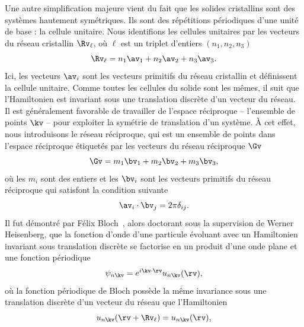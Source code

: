 Une autre simplification majeure vient du fait que les solides cristallins sont des systèmes hautement symétriques. Ils sont des répétitions périodiques d'une unité de base : la cellule unitaire. Nous identifions les cellules unitaires par les vecteurs du réseau cristallin $\Rv_\ell$, où $\ell$ est un triplet d'entiers $(n_1,n_2,n_3)$
\begin{equation}
    \Rv_\ell = n_1\av_1+n_2\av_2+n_3\av_3.
    \label{eqn:c2_Rl}
\end{equation}
Ici, les vecteurs $\av_i$ sont les vecteurs primitifs du réseau cristallin et définissent la cellule unitaire. Comme toutes les cellules du solide sont les mêmes, il suit que l'Hamiltonien est invariant sous une translation discrète d'un vecteur du réseau. Il est généralement favorable de travailler de l'espace réciproque -- l'ensemble de points $\kv$ -- pour exploiter la symétrie de translation d'un système. À cet effet, nous introduisons le réseau réciproque, qui est un ensemble de points dans l'espace réciproque étiquetés par les vecteurs du réseau réciproque $\Gv$
\begin{equation}
    \Gv = m_1\bv_1+m_2\bv_2+m_3\bv_3,
    \label{eqn:c2_G}
\end{equation}
où les $m_i$ sont des entiers et les $\bv_i$ sont les vecteurs primitifs du réseau réciproque qui satisfont la condition suivante
\begin{equation}
    \av_i\cdot\bv_j=2\pi\delta_{ij}.
\end{equation}
Il fut démontré par Félix Bloch~\cite{blochUeberQuantenmechanikElektronen1929}, alors doctorant sous la supervision de Werner Heisenberg, que la fonction d'onde d'une particule évoluant avec un Hamiltonien invariant sous translation discrète se factorise en un produit d'une onde plane et une fonction périodique
\begin{equation}
    \psi_{n\kv}=e^{i\kv\cdot\rv}u_{n\kv}(\rv),
    \label{eqn:c2_bloch_thm}
\end{equation}
où la fonction périodique de Bloch possède la même invariance sous une translation discrète d'un vecteur du réseau que l'Hamiltonien
\begin{equation}
    u_{n\kv}(\rv+\Rv_\ell)=u_{n\kv}(\rv),
    \label{eqn:c2_unk}
\end{equation}
